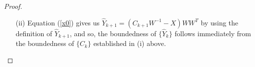 \documentclass[twoside,11pt]{article}
\begin{document}
\begin{proof}
\begin{enumerate}[(i)]
	\begin{equation*}
	\|C_{k+1}Q\|_F\leq (1+\frac{\lambda}{\mu_k})^{-1}\|C_kQ\|_F+O(\frac{1}{\mu_k}),
	\end{equation*}
	which, by the unitary invariance of the norm, is equivalent to
	\begin{equation*}
	\|C_{k+1}\|_F\leq (1+\frac{\lambda}{\mu_k})^{-1}\|C_k\|_F+\frac{C}{\mu_k}~{\rm for~all}~k,
	\end{equation*}
	for some constant $C>0$ independent of  $k$.
	Finally, using the fact that $\mu_{k+1}=\rho\mu_k$ with $\rho>1$, we see that the above inequality implies (by mathematical induction) that $\|C_k\|_F\leq C^*$ for some constant $C^*>0$ (say, $C^*=C(\mu_0+\lambda)/(\mu_0\lambda)$ would work). This completes the proof of the boundedness of $\{C_k\}$.\\
\item[(ii)] Equation (\ref{x0}) gives us $\hat{Y}_{k+1}=(C_{k+1}W^{-1}-X)WW^T$ by using the definition of $\hat{Y}_{k+1}$, and so, the boundedness of $\{\hat{Y}_k\}$ follows immediately from the boundedness of $\{C_k\}$ established in (i) above.
\end{enumerate}
\end{proof}
\end{document}
